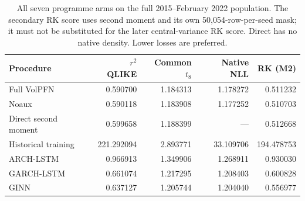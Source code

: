 \begin{table}[H]\centering
\begingroup\small\setlength{\tabcolsep}{4pt}
\caption[All training-configuration scores]{All seven programme arms on the full 2015--February 2022 population. The secondary RK score uses second moment and its own 50,054-row-per-seed mask; it must not be substituted for the later central-variance RK score. Direct has no native density. Lower losses are preferred.}\label{tab:new-all-programme}
\begin{tabular}{@{}>{\raggedright\arraybackslash}p{3.3cm}rrrr@{}}
\toprule
Procedure & $r^2$ QLIKE & Common $t_8$ & Native NLL & RK (M2) \\
\midrule
Full VolPFN & 0.590700 & 1.184313 & 1.178272 & 0.511232 \\
Noaux & 0.590118 & 1.183908 & 1.177252 & 0.510703 \\
Direct second moment & 0.599658 & 1.188399 & --- & 0.512668 \\
Historical training & 221.292094 & 2.893771 & 33.109706 & 194.478753 \\
ARCH-LSTM & 0.966913 & 1.349906 & 1.268911 & 0.930030 \\
GARCH-LSTM & 0.661074 & 1.217295 & 1.208403 & 0.600828 \\
GINN & 0.637127 & 1.205744 & 1.204040 & 0.556977 \\
\bottomrule
\end{tabular}\endgroup\end{table}

